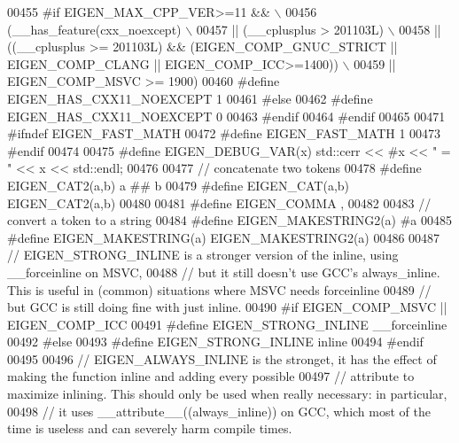 \begin{DoxyCode}
00455 \textcolor{preprocessor}{  #if    EIGEN\_MAX\_CPP\_VER>=11 && \(\backslash\)}
00456 \textcolor{preprocessor}{         (\_\_has\_feature(cxx\_noexcept) \(\backslash\)}
00457 \textcolor{preprocessor}{      || (\_\_cplusplus > 201103L) \(\backslash\)}
00458 \textcolor{preprocessor}{      || ((\_\_cplusplus >= 201103L) && (EIGEN\_COMP\_GNUC\_STRICT || EIGEN\_COMP\_CLANG || EIGEN\_COMP\_ICC>=1400))
       \(\backslash\)}
00459 \textcolor{preprocessor}{      || EIGEN\_COMP\_MSVC >= 1900)}
00460 \textcolor{preprocessor}{    #define EIGEN\_HAS\_CXX11\_NOEXCEPT 1}
00461 \textcolor{preprocessor}{  #else}
00462 \textcolor{preprocessor}{    #define EIGEN\_HAS\_CXX11\_NOEXCEPT 0}
00463 \textcolor{preprocessor}{  #endif}
00464 \textcolor{preprocessor}{#endif}
00465 
00471 \textcolor{preprocessor}{#ifndef EIGEN\_FAST\_MATH}
00472 \textcolor{preprocessor}{#define EIGEN\_FAST\_MATH 1}
00473 \textcolor{preprocessor}{#endif}
00474 
00475 \textcolor{preprocessor}{#define EIGEN\_DEBUG\_VAR(x) std::cerr << #x << " = " << x << std::endl;}
00476 
00477 \textcolor{comment}{// concatenate two tokens}
00478 \textcolor{preprocessor}{#define EIGEN\_CAT2(a,b) a ## b}
00479 \textcolor{preprocessor}{#define EIGEN\_CAT(a,b) EIGEN\_CAT2(a,b)}
00480 
00481 \textcolor{preprocessor}{#define EIGEN\_COMMA ,}
00482 
00483 \textcolor{comment}{// convert a token to a string}
00484 \textcolor{preprocessor}{#define EIGEN\_MAKESTRING2(a) #a}
00485 \textcolor{preprocessor}{#define EIGEN\_MAKESTRING(a) EIGEN\_MAKESTRING2(a)}
00486 
00487 \textcolor{comment}{// EIGEN\_STRONG\_INLINE is a stronger version of the inline, using \_\_forceinline on MSVC,}
00488 \textcolor{comment}{// but it still doesn't use GCC's always\_inline. This is useful in (common) situations where MSVC needs
       forceinline}
00489 \textcolor{comment}{// but GCC is still doing fine with just inline.}
00490 \textcolor{preprocessor}{#if EIGEN\_COMP\_MSVC || EIGEN\_COMP\_ICC}
00491 \textcolor{preprocessor}{#define EIGEN\_STRONG\_INLINE \_\_forceinline}
00492 \textcolor{preprocessor}{#else}
00493 \textcolor{preprocessor}{#define EIGEN\_STRONG\_INLINE inline}
00494 \textcolor{preprocessor}{#endif}
00495 
00496 \textcolor{comment}{// EIGEN\_ALWAYS\_INLINE is the stronget, it has the effect of making the function inline and adding every
       possible}
00497 \textcolor{comment}{// attribute to maximize inlining. This should only be used when really necessary: in particular,}
00498 \textcolor{comment}{// it uses \_\_attribute\_\_((always\_inline)) on GCC, which most of the time is useless and can severely harm
       compile times.}

\end{DoxyCode}
